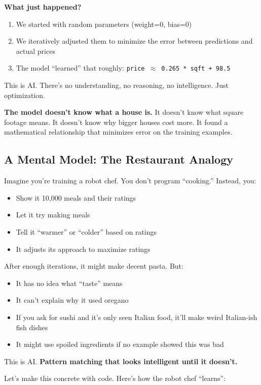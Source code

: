 \textbf{What just happened?}
\begin{enumerate}
\item We started with random parameters (weight=0, bias=0)
\item We iteratively adjusted them to minimize the error between predictions and actual prices
\item The model ``learned'' that roughly: \texttt{price \(\approx\) 0.265 * sqft + 98.5}
\end{enumerate}

This is AI. There's no understanding, no reasoning, no intelligence. Just optimization.

\textbf{The model doesn't know what a house is.} It doesn't know what square footage means. It doesn't know why bigger houses cost more. It found a mathematical relationship that minimizes error on the training examples.

\subsection{A Mental Model: The Restaurant Analogy}

Imagine you're training a robot chef. You don't program ``cooking.'' Instead, you:
\begin{itemize}
\item Show it 10,000 meals and their ratings
\item Let it try making meals
\item Tell it ``warmer'' or ``colder'' based on ratings
\item It adjusts its approach to maximize ratings
\end{itemize}

After enough iterations, it might make decent pasta. But:
\begin{itemize}
\item It has no idea what ``taste'' means
\item It can't explain why it used oregano
\item If you ask for sushi and it's only seen Italian food, it'll make weird Italian-ish fish dishes
\item It might use spoiled ingredients if no example showed this was bad
\end{itemize}

This is AI. \textbf{Pattern matching that looks intelligent until it doesn't.}

Let's make this concrete with code. Here's how the robot chef ``learns'':

